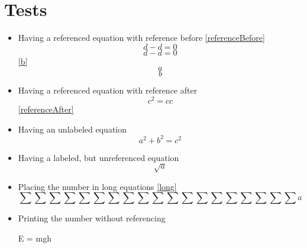 \documentclass{article}
\begin{document}

	\section*{Tests}
	\begin{itemize}
		\item Having a referenced equation with reference before \ref{referenceBefore}
			\begin{equation}\label{referenceBefore}
				d - d = 0
			\end{equation}
			\begin{equation}\label{referenceNo}
				d - d = 0
			\end{equation}
		\ref{b}\begin{equation}\label{a}a\end{equation}\begin{equation}\label{b}b\end{equation}
		\item Having a referenced equation with reference after
			\begin{equation}\label{referenceAfter}
				c^2 = c c
			\end{equation}
			\ref{referenceAfter}
		\item Having an unlabeled equation
			\begin{equation}\label{abc}
				a^2 + b^2 = c^2
			\end{equation}
		\item Having a labeled, but unreferenced equation
			\begin{equation}\label{unreferenced}
				\sqrt{a}
			\end{equation}
		\item Placing the number in long equations \ref{long}
			\begin{equation}\label{long}
				\sum\sum\sum\sum\sum\sum\sum\sum\sum\sum\sum\sum\sum\sum\sum\sum\sum\sum\sum a
			\end{equation}
		\item Printing the number without referencing
			\begin{equation+}
				E = mgh
			\end{equation+}

\end{itemize}
\end{document}
